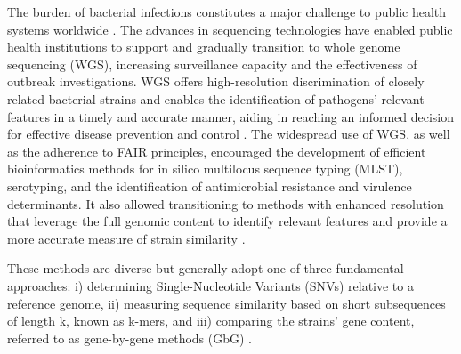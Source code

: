 The burden of bacterial infections constitutes a major challenge to public health systems worldwide \citep{ikuta_global_2022, noauthor_who_2024}. The advances in sequencing technologies have enabled public health institutions to support and gradually transition to whole genome sequencing (WGS), increasing surveillance capacity and the effectiveness of outbreak investigations. WGS offers high-resolution discrimination of closely related bacterial strains and enables the identification of pathogens’ relevant features in a timely and accurate manner, aiding in reaching an informed decision for effective disease prevention and control \citep{authority_efsa_efsa_2024, struelens_real-time_2024, european_centre_for_disease_prevention_and_control_ecdc_2019, authority_efsa_guidelines_2022}. The widespread use of WGS, as well as the adherence to FAIR principles, encouraged the development of efficient bioinformatics methods for in silico multilocus sequence typing (MLST), serotyping, and the identification of antimicrobial resistance and virulence determinants. It also allowed transitioning to methods with enhanced resolution that leverage the full genomic content to identify relevant features and provide a more accurate measure of strain similarity \citep{uelze_typing_2020}.

These methods are diverse but generally adopt one of three fundamental approaches: i) determining Single-Nucleotide Variants (SNVs) relative to a reference genome, ii) measuring sequence similarity based on short subsequences of length k, known as k-mers, and iii) comparing the strains' gene content, referred to as gene-by-gene methods (GbG) \citep{uelze_typing_2020}.

